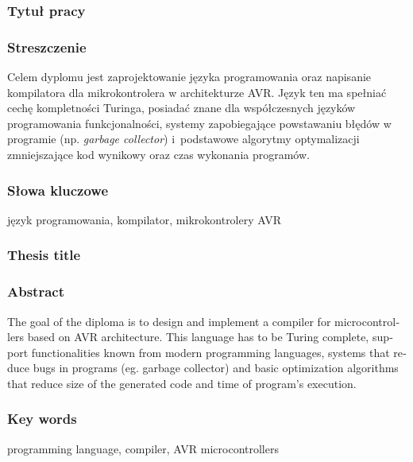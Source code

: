 \subsubsection*{Tytuł pracy} 
\Title

\subsubsection*{Streszczenie}  
Celem dyplomu jest zaprojektowanie języka programowania oraz napisanie kompilatora dla mikrokontrolera w architekturze AVR. Język ten ma spełniać cechę kompletności Turinga, posiadać znane dla współczesnych języków programowania funkcjonalności, systemy zapobiegające powstawaniu błędów w programie (np. \foreignlanguage{british}{\emph{garbage collector}}) i~podstawowe algorytmy optymalizacji zmniejszające kod wynikowy oraz czas wykonania programów.

\subsubsection*{Słowa kluczowe} 
język programowania, kompilator, mikrokontrolery AVR

\subsubsection*{Thesis title} 
\begin{otherlanguage}{british}
\TitleAlt
\end{otherlanguage}

\subsubsection*{Abstract} 
\begin{otherlanguage}{british}
The goal of the diploma is to design and implement a compiler for microcontrollers based on AVR architecture. This language has to be Turing complete, support functionalities known from modern programming languages, systems that reduce bugs in programs (eg. garbage collector) and basic optimization algorithms that reduce size of the generated code and time of program's execution.
\end{otherlanguage}
\subsubsection*{Key words}  
\begin{otherlanguage}{british}
programming language, compiler, AVR microcontrollers
\end{otherlanguage}

